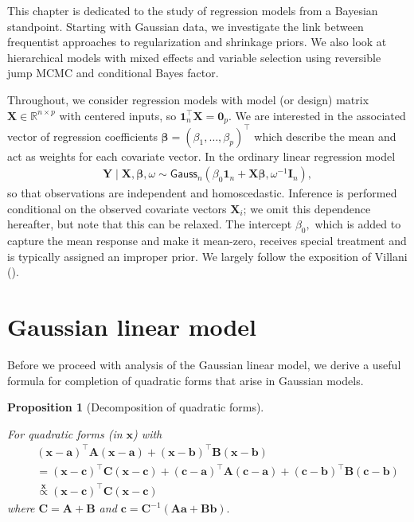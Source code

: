 \documentclass[
  11pt,
  letterpaper,
]{scrbook}
\theoremstyle{plain}
\theoremstyle{plain}
\newtheorem{proposition}{Proposition}[chapter]
\theoremstyle{definition}
\theoremstyle{definition}
\theoremstyle{definition}
\theoremstyle{plain}
\theoremstyle{remark}
\begin{document}
This chapter is dedicated to the study of regression models from a
Bayesian standpoint. Starting with Gaussian data, we investigate the
link between frequentist approaches to regularization and shrinkage
priors. We also look at hierarchical models with mixed effects and
variable selection using reversible jump MCMC and conditional Bayes
factor.

Throughout, we consider regression models with model (or design) matrix
\(\mathbf{X} \in \mathbb{R}^{n \times p}\) with centered inputs, so
\(\mathbf{1}_n^\top\mathbf{X}=\mathbf{0}_p.\) We are interested in the
associated vector of regression coefficients
\(\boldsymbol{\beta} = (\beta_1, \ldots, \beta_p)^\top\) which describe
the mean and act as weights for each covariate vector. In the ordinary
linear regression model \begin{align*}
\boldsymbol{Y} \mid \mathbf{X}, \boldsymbol{\beta}, \omega \sim \mathsf{Gauss}_n(\beta_0\mathbf{1}_n + \mathbf{X}\boldsymbol{\beta}, \omega^{-1}\mathbf{I}_n),
\end{align*} so that observations are independent and homoscedastic.
Inference is performed conditional on the observed covariate vectors
\(\mathbf{X}_i\); we omit this dependence hereafter, but note that this
can be relaxed. The intercept \(\beta_0,\) which is added to capture the
mean response and make it mean-zero, receives special treatment and is
typically assigned an improper prior. We largely follow the exposition
of Villani ().

\section{Gaussian linear model}\label{gaussian-linear-model}

Before we proceed with analysis of the Gaussian linear model, we derive
a useful formula for completion of quadratic forms that arise in
Gaussian models.

\begin{proposition}[Decomposition of quadratic
forms]\protect\hypertarget{prp-quadratic-forms}{}\label{prp-quadratic-forms}

For quadratic forms (in \(\boldsymbol{x}\)) with \begin{align*}
& (\boldsymbol{x} - \boldsymbol{a})^\top \mathbf{A}(\boldsymbol{x} - \boldsymbol{a}) + (\boldsymbol{x} - \boldsymbol{b})^\top \mathbf{B}(\boldsymbol{x} - \boldsymbol{b}) \\\quad &=
 (\boldsymbol{x} - \boldsymbol{c})^\top \mathbf{C}(\boldsymbol{x} - \boldsymbol{c}) + (\boldsymbol{c}-\boldsymbol{a})^\top\mathbf{A}(\boldsymbol{c}-\boldsymbol{a}) + (\boldsymbol{c}-\boldsymbol{b})^\top\mathbf{B}(\boldsymbol{c}-\boldsymbol{b})\\
&\stackrel{\boldsymbol{x}}{\propto} (\boldsymbol{x} - \boldsymbol{c})^\top \mathbf{C}(\boldsymbol{x} - \boldsymbol{c})
\end{align*} where \(\mathbf{C} = \mathbf{A} + \mathbf{B}\) and
\(\boldsymbol{c}= \mathbf{C}^{-1}(\mathbf{A}\boldsymbol{a} + \mathbf{B}\boldsymbol{b}).\)

\end{proposition}
\end{document}
